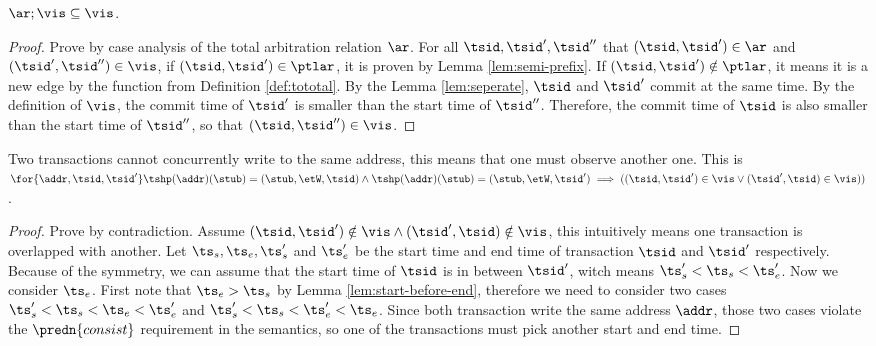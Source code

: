 \begin{lem}[Prefix]     
    \label{lem:prefix}
    \( \ar; \vis \subseteq \vis \).
\end{lem}
\begin{proof}
    Prove by case analysis of the total arbitration relation \( \ar \).
    For all \( \tsid, \tsid', \tsid'' \) that \( (\tsid, \tsid') \in \ar \) and \( (\tsid', \tsid'') \in \vis \), if \( (\tsid, \tsid') \in \ptlar \), it is proven by Lemma \ref{lem:semi-prefix}.
    If \( ( \tsid, \tsid' ) \notin \ptlar \), it means it is a new edge by the  function from Definition \ref{def:tototal}.
    By the Lemma \ref{lem:seperate}, \( \tsid \) and \( \tsid' \) commit at the same time.
    By the definition of \( \vis \), the commit time of \( \tsid' \) is smaller than the start time of \( \tsid'' \).
    Therefore, the commit time of \( \tsid \) is also smaller than the start time of \( \tsid'' \), so that \( ( \tsid, \tsid'' ) \in \vis \).
\end{proof}

\begin{lem}[No conflict]
    \label{lem:nocoflict}
    Two transactions cannot concurrently write to the same address, this means that one must observe another one.
    This is \( \for{ \addr, \tsid, \tsid' } \tshp(\addr)(\stub) = (\stub, \etW, \tsid) \land  \tshp(\addr)(\stub) = (\stub, \etW, \tsid' ) \implies ((\tsid, \tsid') \in \vis \lor (\tsid', \tsid) \in \vis ))\).
\end{lem}
\begin{proof}
    Prove by contradiction.
    Assume \( (\tsid, \tsid') \notin \vis \land (\tsid', \tsid) \notin \vis \), this intuitively means one transaction is overlapped with another.
    Let \( \ts_{s}, \ts_{e}, \ts'_{s} \) and \( \ts'_{e} \) be the start time and end time of transaction \( \tsid \) and \( \tsid' \) respectively.
    Because of the symmetry,  we can assume that the start time of \( \tsid \) is in between \( \tsid' \), witch means \( \ts'_{s} < \ts_{s} < \ts'_{e} \).
    Now we consider \( \ts_{e} \).
    First note that \( \ts_{e} > \ts_{s} \) by Lemma \ref{lem:start-before-end}, therefore we need to consider two cases \( \ts'_{s} < \ts_{s} < \ts_{e} < \ts'_{e} \) and  \( \ts'_{s} < \ts_{s} < \ts'_{e} < \ts_{e}  \).
    Since both transaction write the same address \( \addr \), those two cases violate the \( \predn{consist} \) requirement in the semantics, so one of the transactions must pick another start and end time.
\end{proof}

